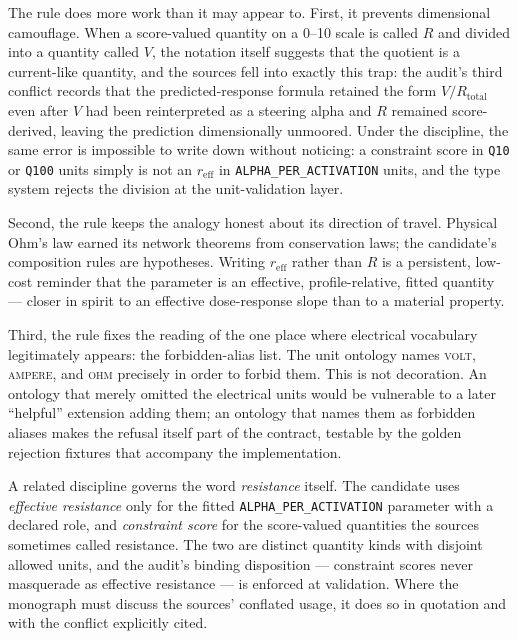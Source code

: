 The rule does more work than it may appear to. First, it prevents dimensional camouflage. When a score-valued quantity on a 0--10 scale is called $R$ and divided into a quantity called $V$, the notation itself suggests that the quotient is a current-like quantity, and the sources fell into exactly this trap: the audit's third conflict records that the predicted-response formula retained the form $V/R_{\mathrm{total}}$ even after $V$ had been reinterpreted as a steering alpha and $R$ remained score-derived, leaving the prediction dimensionally unmoored. Under the discipline, the same error is impossible to write down without noticing: a constraint score in \texttt{Q10} or \texttt{Q100} units simply is not an $r_{\mathrm{eff}}$ in \texttt{ALPHA\_PER\_ACTIVATION} units, and the type system rejects the division at the unit-validation layer.

Second, the rule keeps the analogy honest about its direction of travel. Physical Ohm's law earned its network theorems from conservation laws; the candidate's composition rules are hypotheses. Writing $r_{\mathrm{eff}}$ rather than $R$ is a persistent, low-cost reminder that the parameter is an effective, profile-relative, fitted quantity --- closer in spirit to an effective dose-response slope than to a material property.

Third, the rule fixes the reading of the one place where electrical vocabulary legitimately appears: the forbidden-alias list. The unit ontology names \textsc{volt}, \textsc{ampere}, and \textsc{ohm} precisely in order to forbid them. This is not decoration. An ontology that merely omitted the electrical units would be vulnerable to a later ``helpful'' extension adding them; an ontology that names them as forbidden aliases makes the refusal itself part of the contract, testable by the golden rejection fixtures that accompany the implementation.

A related discipline governs the word \emph{resistance} itself. The candidate uses \emph{effective resistance} only for the fitted \texttt{ALPHA\_PER\_ACTIVATION} parameter with a declared role, and \emph{constraint score} for the score-valued quantities the sources sometimes called resistance. The two are distinct quantity kinds with disjoint allowed units, and the audit's binding disposition --- constraint scores never masquerade as effective resistance --- is enforced at validation. Where the monograph must discuss the sources' conflated usage, it does so in quotation and with the conflict explicitly cited.

